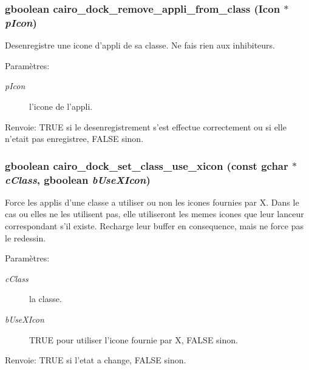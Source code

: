 \subsubsection{\setlength{\rightskip}{0pt plus 5cm}gboolean cairo\_\-dock\_\-remove\_\-appli\_\-from\_\-class ({\bf Icon} $\ast$ {\em pIcon})}\label{cairo-dock-class-manager_8h_ce18967c63ea26e22cb17af54b7fb9c0}


Desenregistre une icone d'appli de sa classe. Ne fais rien aux inhibiteurs. \begin{Desc}
\item[Paramètres:]
\begin{description}
\item[{\em pIcon}]l'icone de l'appli. \end{description}
\end{Desc}
\begin{Desc}
\item[Renvoie:]TRUE si le desenregistrement s'est effectue correctement ou si elle n'etait pas enregistree, FALSE sinon. \end{Desc}
\subsubsection{\setlength{\rightskip}{0pt plus 5cm}gboolean cairo\_\-dock\_\-set\_\-class\_\-use\_\-xicon (const gchar $\ast$ {\em cClass}, gboolean {\em bUseXIcon})}\label{cairo-dock-class-manager_8h_4dbc6a4e56979df736691b74cf92fa12}


Force les applis d'une classe a utiliser ou non les icones fournies par X. Dans le cas ou elles ne les utilisent pas, elle utiliseront les memes icones que leur lanceur correspondant s'il existe. Recharge leur buffer en consequence, mais ne force pas le redessin. \begin{Desc}
\item[Paramètres:]
\begin{description}
\item[{\em cClass}]la classe. \item[{\em bUseXIcon}]TRUE pour utiliser l'icone fournie par X, FALSE sinon. \end{description}
\end{Desc}
\begin{Desc}
\item[Renvoie:]TRUE si l'etat a change, FALSE sinon. \end{Desc}
